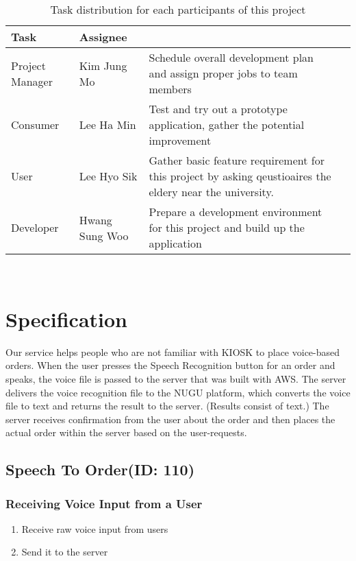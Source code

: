 \documentclass[conference,compsoc]{IEEEtran}
\begin{document}
\begin{table}[h] {\renewcommand\arraystretch{1.25}
\begin{tabular}{|l|l|l|l|} \hline
\bf Task & \bf Assignee & \bf \multicolumn{1}{l}{Description} \\ \hline
Project Manager & Kim Jung Mo & \multicolumn{1}{p{3.3cm}|}{\raggedright Schedule overall development plan and assign proper jobs to team members} \\ \hline
Consumer & Lee Ha Min & \multicolumn{1}{p{3.3cm}|}{\raggedright Test and try out a prototype application, gather the potential improvement} \\ \hline
User & Lee Hyo Sik & \multicolumn{1}{p{3.3cm}|}{\raggedright Gather basic feature requirement for this project by asking qeustioaires the eldery near the university.} \\ \hline
Developer & Hwang Sung Woo & \multicolumn{1}{p{3.3cm}|}{\raggedright Prepare a development environment for this project and build up the application} \\ \hline
\end{tabular}} \\
\caption{Task distribution  for each participants of this project}
\label{tab:table1}
\end{table}

\section{Specification}
Our service helps people who are not familiar with KIOSK to place voice-based orders. When the user presses the Speech Recognition button for an order and speaks, the voice file is passed to the server that was built with AWS. The server delivers the voice recognition file to the NUGU platform, which converts the voice file to text and returns the result to the server. (Results consist of text.) The server receives confirmation from the user about the order and then places the actual order within the server based on the user-requests.

\subsection{Speech To Order(ID: 110)}
\subsubsection{Receiving Voice Input from a User}
\begin{enumerate}
  \item Receive raw voice input from users
  \item Send it to the server
\end{enumerate}
\end{document}

